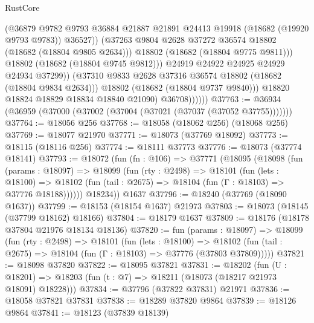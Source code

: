 \begin{lexlean}{RustCore}
\begin{coremodule}
                              (@36879
                                @9782
                                @9793
                                @36884
                                @21887
                                @21891
                                @24413
                                @19918
                                (@18682 (@19920 @9793 @9783))
                                @36527))
                            (@37263 @9804 @2628 @37272 @36574 @18802 (@18682 (@18804 @9805 @2634)))
                            @18802
                            (@18682 (@18804 @9775 @9811)))
                          @18802
                          (@18682 (@18804 @9745 @9812)))
                        @24919
                        @24922
                        @24925
                        @24929
                        @24934
                        @37299))
                    (@37310 @9833 @2628 @37316 @36574 @18802 (@18682 (@18804 @9834 @2634)))
                    @18802
                    (@18682 (@18804 @9737 @9840)))
                  @18820
                  @18824
                  @18829
                  @18834
                  @18840
                  @21090)
                @36708))))))
@37763 := @36934 (@36959 (@37000 (@37002 (@37004 (@37021 (@37037 (@37052 @37755)))))))
@37764 := @18056 @256
@37768 := @18058 (@18062 @256) (@18068 @256)
@37769 := @18077 @21970
@37771 := @18073 (@37769 @18092)
@37773 := @18115 (@18116 @256)
@37774 := @18111 @37773
@37776 := @18073 (@37774 @18141)
@37793 := @18072
    (fun (fn : @106) =>
    @37771
      (@18095
        (@18098
          (fun (params : @18097) =>
          @18099
            (fun (rty : @2498) =>
            @18101
              (fun (lets : @18100) =>
              @18102 (fun (tail : @2675) => @18104 (fun (Γ : @18103) => @37776 @18188))))))
        @18234))
    @1637
@37796 := @18240 (@37769 (@18090 @1637))
@37799 := @18153 (@18154 @1637) @21973
@37803 := @18073 (@18145 (@37799 @18162) @18166)
@37804 := @18179 @1637
@37809 := @18176 (@18178 @37804 @21976 @18134 @18136)
@37820 := fun (params : @18097) =>
  @18099
    (fun (rty : @2498) =>
    @18101
      (fun (lets : @18100) =>
      @18102 (fun (tail : @2675) => @18104 (fun (Γ : @18103) => @37776 (@37803 @37809)))))
@37821 := @18098 @37820
@37822 := @18095 @37821
@37831 := @18202
    (fun (U : @18201) => @18203 (fun (t : @7) => @18211 (@18073 (@18217 @21973 @18091) @18228)))
@37834 := @37796 (@37822 @37831) @21971
@37836 := @18058 @37821 @37831
@37838 := @18289 @37820 @9864
@37839 := @18126 @9864
@37841 := @18123 (@37839 @18139)

\end{coremodule}
\end{lexlean}
